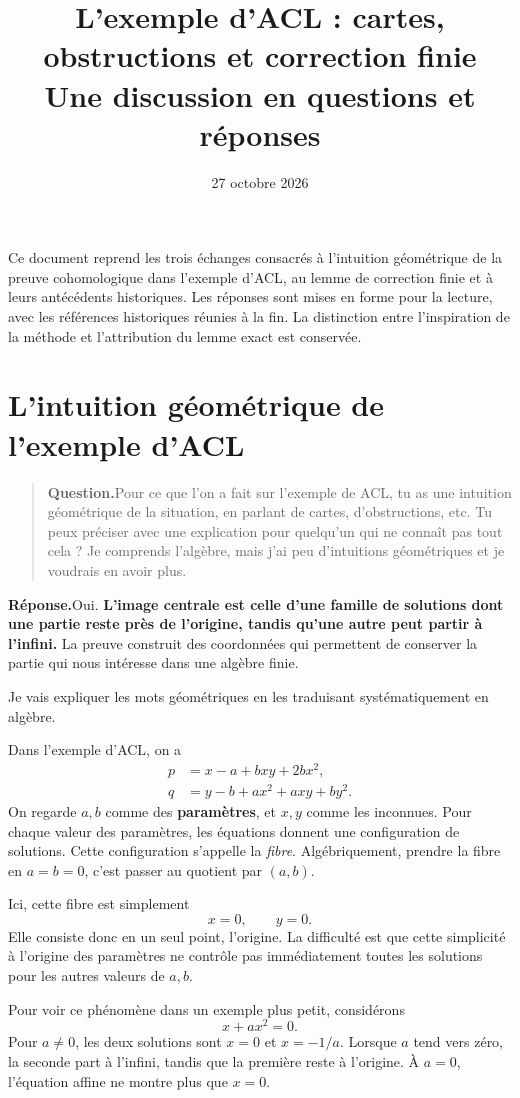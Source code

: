 \documentclass[11pt,a4paper]{article}
\title{L'exemple d'ACL : cartes, obstructions et correction finie\\
\large Une discussion en questions et réponses}
\author{}
\date{27 octobre 2026}
\newcommand{\question}[1]{\begin{quote}\textbf{Question.}\enspace #1\end{quote}}
\newcommand{\reponse}{\noindent\textbf{Réponse.}\enspace}
\begin{document}
\maketitle

\noindent Ce document reprend les trois échanges consacrés à l'intuition
géométrique de la preuve cohomologique dans l'exemple d'ACL, au lemme de
correction finie et à leurs antécédents historiques. Les réponses sont
mises en forme pour la lecture, avec les références historiques réunies
à la fin. La distinction entre l'inspiration de la méthode et
l'attribution du lemme exact est conservée.

\section{L'intuition géométrique de l'exemple d'ACL}

\question{Pour ce que l'on a fait sur l'exemple de ACL, tu as une intuition
géométrique de la situation, en parlant de cartes, d'obstructions, etc.
Tu peux préciser avec une explication pour quelqu'un qui ne connaît pas
tout cela ? Je comprends l'algèbre, mais j'ai peu d'intuitions géométriques
et je voudrais en avoir plus.}

\reponse Oui. \textbf{L'image centrale est celle d'une famille de solutions
dont une partie reste près de l'origine, tandis qu'une autre peut partir
à l'infini.} La preuve construit des coordonnées qui permettent de
conserver la partie qui nous intéresse dans une algèbre finie.

Je vais expliquer les mots géométriques en les traduisant systématiquement
en algèbre.

Dans l'exemple d'ACL, on a
\[
\begin{aligned}
 p&=x-a+bxy+2bx^2,\\
 q&=y-b+ax^2+axy+by^2.
\end{aligned}
\]
On regarde $a,b$ comme des \textbf{paramètres}, et $x,y$ comme les inconnues.
Pour chaque valeur des paramètres, les équations donnent une configuration
de solutions. Cette configuration s'appelle la \emph{fibre}.
Algébriquement, prendre la fibre en $a=b=0$, c'est passer au quotient
par $(a,b)$.

Ici, cette fibre est simplement
\[
 x=0,\qquad y=0.
\]
Elle consiste donc en un seul point, l'origine. La difficulté est que
cette simplicité à l'origine des paramètres ne contrôle pas immédiatement
toutes les solutions pour les autres valeurs de $a,b$.

Pour voir ce phénomène dans un exemple plus petit, considérons
\[
 x+ax^2=0.
\]
Pour $a\neq0$, les deux solutions sont $x=0$ et $x=-1/a$.
Lorsque $a$ tend vers zéro, la seconde part à l'infini, tandis que la
première reste à l'origine. À $a=0$, l'équation affine ne montre plus
que $x=0$.
\end{document}
